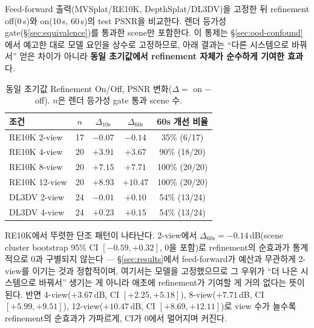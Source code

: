 Feed-forward 출력(MVSplat/RE10K, DepthSplat/DL3DV)을 고정한 뒤 refinement off(0\,s)와 on(10\,s, 60\,s)의 test PSNR을 비교한다. 렌더 등가성 gate(\S\ref{sec:equivalence})를 통과한 scene만 포함한다. 이 통제는 \S\ref{sec:ood-confound}에서 예고한 대로 모델 요인을 상수로 고정하므로, 아래 결과는 ``다른 시스템으로 바꿔서'' 얻은 차이가 아니라 \textbf{동일 초기값에서 refinement 자체가 순수하게 기여한 효과}다.

\begin{table}[h]
\centering
\caption{동일 초기값 Refinement On/Off, PSNR 변화($\Delta = $ on $-$ off). $n$은 렌더 등가성 gate 통과 scene 수.}
\label{tab:c1b}
\small
\begin{tabular}{@{}l c cc c@{}}
\toprule
조건 & $n$ & $\Delta_{10\text{s}}$ & $\Delta_{60\text{s}}$ & 60s 개선 비율 \\
\midrule
RE10K 2-view  & 17 & $-0.07$ & $-0.14$  & 35\% (6/17) \\
RE10K 4-view  & 20 & $+3.91$ & $+3.67$  & 90\% (18/20) \\
RE10K 8-view  & 20 & $+7.15$ & $+7.71$  & 100\% (20/20) \\
RE10K 12-view & 20 & $+8.93$ & $+10.47$ & 100\% (20/20) \\
DL3DV 2-view  & 24 & $-0.01$ & $+0.10$  & 54\% (13/24) \\
DL3DV 4-view  & 24 & $+0.23$ & $+0.15$  & 54\% (13/24) \\
\bottomrule
\end{tabular}
\end{table}

RE10K에서 뚜렷한 단조 패턴이 나타난다. 2-view에서 $\Delta_{60\text{s}} = -0.14\,$dB(scene cluster bootstrap 95\% CI $[-0.59, +0.32]$, 0을 포함)로 refinement의 순효과가 통계적으로 0과 구별되지 않는다 — \S\ref{sec:results}에서 feed-forward가 예산과 무관하게 2-view를 이기는 것과 정합적이며, 여기서는 모델을 고정했으므로 그 우위가 ``더 나은 시스템으로 바꿔서'' 생기는 게 아니라 애초에 refinement가 기여할 게 거의 없다는 뜻이 된다. 반면 4-view($+3.67\,$dB, CI $[+2.25, +5.18]$), 8-view($+7.71\,$dB, CI $[+5.99, +9.51]$), 12-view($+10.47\,$dB, CI $[+8.69, +12.11]$)로 view 수가 늘수록 refinement의 순효과가 가파르게, CI가 0에서 멀어지며 커진다.

